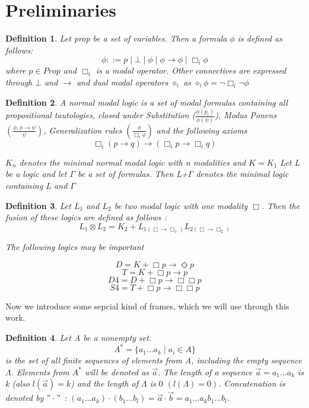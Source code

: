 \documentclass[12pt, a4paper]{scrartcl}
\newtheorem{definition}{Definition}[subsection]
\begin{document}
 \section{Preliminaries}
 

\begin{definition}
Let prop be a set of variables. Then a formula $\phi$ is defined as follows:
$$\phi ::= p \mid \bot \mid \phi \mid \phi \rightarrow \phi \mid \Box_i \phi$$
where $p \in Prop$ and $\Box_i$ is a modal operator. Other connectives are expressed through $\bot$ and $\rightarrow$ and 
dual modal operators $\diamond_i$ as $\diamond_i \phi = \neg \Box_i \neg \phi$
\end{definition}

\begin{definition}
A normal modal logic is a set of modal formulas containing all propositional tautologies,
closed under Substitution ($\frac{\phi(p_i)}{\phi(\psi)}$), Modus Ponens 
$(\frac{\phi, \phi \rightarrow \psi}{\psi})$, Generalization rules $(\frac{\phi}{\Box_i \phi})$
and the following axioms 
$$ \Box_i (p \rightarrow q) \rightarrow (\Box_i p \rightarrow \Box_i q)$$

$K_n$ denotes the minimal normal modal logic with n modalities and $K = K_1$
Let L be a logic and let $\Gamma$ be a set of formulas. Then L+$\Gamma$ denotes 
the minimal logic containing L and $\Gamma$
\end{definition}


\begin{definition}
Let $L_1$ and $L_2$ be two modal logic with one modality $\Box$. Then the fusion of these 
logics are defined as follows :
$$ L_1 \otimes L_2 = K_2 + L_{1(\Box \rightarrow \Box_1)} L_{2(\Box \rightarrow \Box_2)} $$

The following logics may be important 

$$D = K + \Box p \rightarrow \Diamond p$$
$$T = K + \Box p \rightarrow p$$
$$D4 = D + \Box p \rightarrow \Box \Box p$$
$$S4 = T + \Box p \rightarrow \Box \Box p$$   
\end{definition}

Now we introduce some sepcial kind of frames, which we will use through this work.
\begin{definition}
    Let A be a nonempty set.
    $$A^* = \{a_1...a_k \mid a_i \in A\}$$ 
    is the set of all finite sequences of elements from A, including the empty sequence $\Lambda$.
    Elements from $A^*$ will be denoted as $\vec{a}$. The length of a sequence $\vec{a} = a_1...a_k$ is k (also $l(\vec{a}) = k$) 
    and the length of $\Lambda$ is $0$ $(l(\Lambda) = 0)$. Concatenation is denoted by $"\cdot"$ : $(a_1...a_k) \cdot (b_1...b_l) = \vec{a} \cdot \vec{b} = a_1...a_kb_1...b_l$.

\end{definition}
\end{document}

